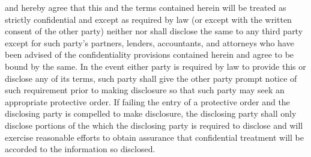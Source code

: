 \lessor and \lessee hereby agree that this \lease and the terms contained herein will be treated as strictly confidential and except as required by law (or except with the written consent of the other party) neither \lessor nor \lessee shall disclose the same to any third party except for such party's partners, lenders, accountants, and attorneys who have been advised of the confidentiality provisions contained herein and agree to be bound by the same. In the event either party is required by law to provide this \lease or disclose any of its terms, such party shall give the other party prompt notice of such requirement prior to making disclosure so that such party may seek an appropriate protective order. If failing the entry of a protective order and the disclosing party is compelled to make disclosure, the disclosing party shall only disclose portions of the \lease which the disclosing party is required to disclose and will exercise reasonable efforts to obtain assurance that confidential treatment will be accorded to the information so disclosed.
